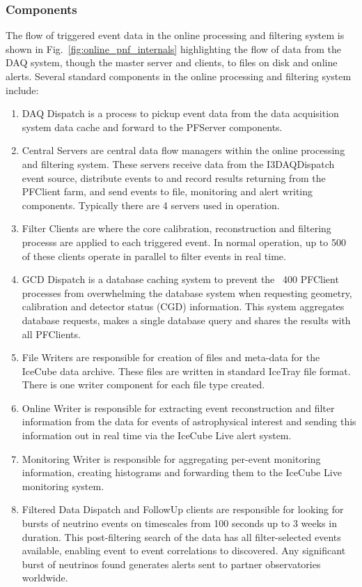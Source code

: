 \subsubsection{Components}
The flow of triggered event data in the online processing and filtering system is shown in Fig.~\ref{fig:online_pnf_internals}
highlighting the flow of data from the DAQ system, though the master server and clients, to files on disk and
online alerts.  Several standard components in the online processing and filtering system include:
\begin{enumerate}
\item DAQ Dispatch is a process to pickup event data from the data acquisition system data cache and forward to
the PFServer components.
\item Central Servers are central data flow managers within the  online processing and filtering system.  These servers 
receive data from the I3DAQDispatch event source, distribute events to and record results returning from the PFClient farm,
and send events to file, monitoring and alert writing components.  Typically there are 4 servers used
in operation.
\item Filter Clients are where the core calibration, reconstruction and filtering processs are applied to each triggered event.  
In normal operation, up to 500 of these clients operate in parallel to filter events in real time.
\item GCD Dispatch is a database caching system to prevent the ~400 PFClient processes from overwhelming the 
database system when requesting geometry, calibration and detector
status (CGD) information.  This system aggregates database requests, makes a single
database query and shares the results with all PFClients.
\item File Writers are responsible for creation of files and meta-data for the IceCube data archive.  These
files are written in standard IceTray file format.  There is one writer component for each file type created.
\item Online Writer is responsible for extracting event reconstruction and filter information from the data for events of astrophysical interest 
and sending this information out  in real time via the IceCube Live alert system.
\item Monitoring Writer is responsible for aggregating per-event monitoring information, creating histograms
and forwarding them to the IceCube Live monitoring system.  
\item Filtered Data Dispatch and FollowUp clients are responsible for looking for bursts of neutrino events on timescales from 100 seconds up to
3 weeks in duration. This post-filtering search of the data has all filter-selected events available, enabling event to event correlations to discovered.  Any 
significant burst of neutrinos found generates alerts sent to partner observatories worldwide.
\end{enumerate}

